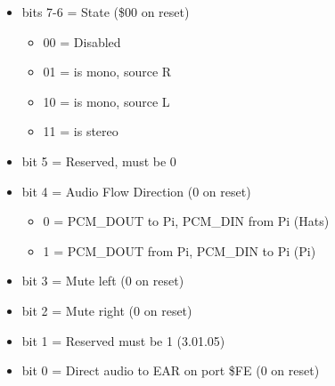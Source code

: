 \begin{itemize}
\item bits 7-6 = \iis State (\$00 on reset)
  \begin{itemize}
  \item 00 = \iis Disabled
  \item 01 = \iis is mono, source R
  \item 10 = \iis is mono, source L
  \item 11 = \iis is stereo
  \end{itemize}
\item bit 5 = Reserved, must be 0
\item bit 4 = Audio Flow Direction (0 on reset)
  \begin{itemize}
  \item 0 = PCM\_DOUT to Pi, PCM\_DIN from Pi (Hats)
  \item 1 = PCM\_DOUT from Pi, PCM\_DIN to Pi (Pi)
  \end{itemize}
\item bit 3 = Mute left (0 on reset)
\item bit 2 = Mute right (0 on reset)
\item bit 1 = Reserved must be 1 (3.01.05)
\item bit 0 = Direct \iis audio to EAR on port \$FE (0 on reset)
\end{itemize}

